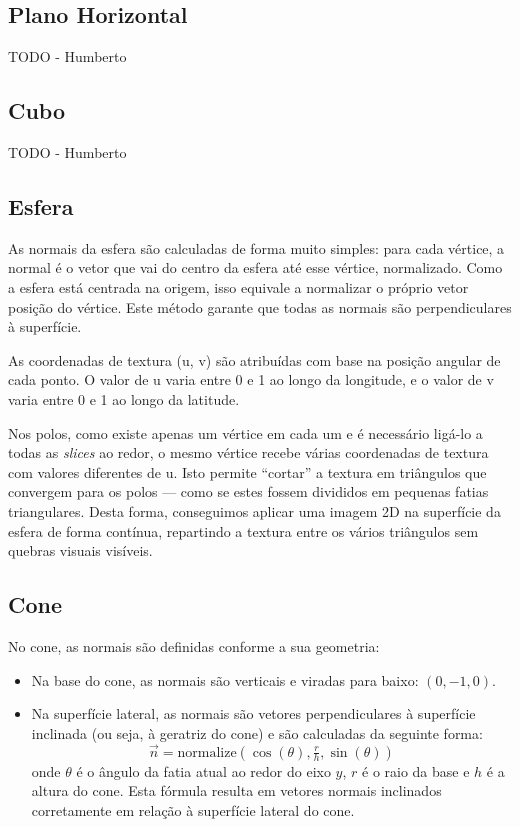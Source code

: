 \documentclass[12pt, a4paper]{article}
\begin{document}
\subsection{Plano Horizontal}

{\color{red} TODO - Humberto}

\subsection{Cubo}

{\color{red} TODO - Humberto}

\subsection{Esfera}

As normais da esfera são calculadas de forma muito simples: para cada vértice, a normal é o vetor
que vai do centro da esfera até esse vértice, normalizado. Como a esfera está centrada na origem,
isso equivale a normalizar o próprio vetor posição do vértice. Este método garante que todas as
normais são perpendiculares à superfície.

As coordenadas de textura (u, v) são atribuídas com base na posição angular de cada ponto. O valor
de u varia entre 0 e 1 ao longo da longitude, e o valor de v varia entre 0 e 1 ao longo da latitude.

Nos polos, como existe apenas um vértice em cada um e é necessário ligá-lo a todas as \emph{slices}
ao redor, o mesmo vértice recebe várias coordenadas de textura com valores diferentes de u.
Isto permite ``cortar'' a textura em triângulos que convergem para os polos — como se estes fossem
divididos em pequenas fatias triangulares.
Desta forma, conseguimos aplicar uma imagem 2D na superfície da esfera de forma contínua, repartindo
a textura entre os vários triângulos sem quebras visuais visíveis.

\subsection{Cone}

No cone, as normais são definidas conforme a sua geometria:

\begin{itemize}
    \item Na base do cone, as normais são verticais e viradas para baixo: $(0, -1, 0)$.
    \item Na superfície lateral, as normais são vetores perpendiculares à superfície
    inclinada (ou seja, à geratriz do cone) e são calculadas da seguinte forma:
\[
\vec{n} = \text{normalize}(\cos(\theta), \tfrac{r}{h}, \sin(\theta))
\]
onde \( \theta \) é o ângulo da fatia atual ao redor do eixo \( y \), \( r \) é o raio da
base e \( h \) é a altura do cone.
Esta fórmula resulta em vetores normais inclinados corretamente em relação à superfície
lateral do cone.
\end{itemize}
\end{document}
